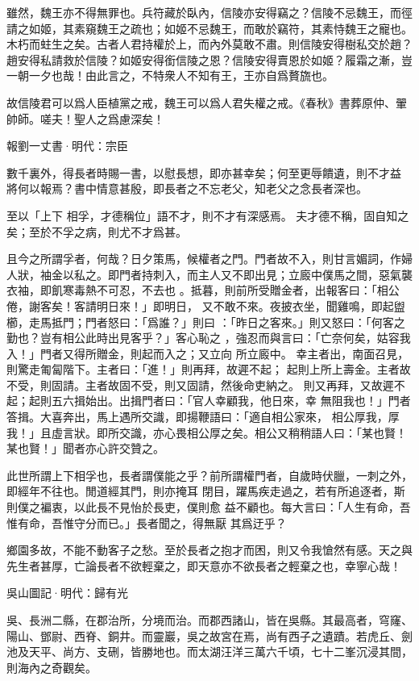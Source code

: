 \documentclass[12pt,a4paper]{ctexbook}
\begin{document}
雖然，魏王亦不得無罪也。兵符藏於臥內，信陵亦安得竊之？信陵不忌魏王，而徑請之如姬，其素窺魏王之疏也；如姬不忌魏王，而敢於竊符，其素恃魏王之寵也。木朽而蛀生之矣。古者人君持權於上，而內外莫敢不肅。則信陵安得樹私交於趙？趙安得私請救於信陵？如姬安得銜信陵之恩？信陵安得賣恩於如姬？履霜之漸，豈一朝一夕也哉！由此言之，不特衆人不知有王，王亦自爲贅旒也。\par
故信陵君可以爲人臣植黨之戒，魏王可以爲人君失權之戒。《春秋》書葬原仲、翬帥師。嗟夫！聖人之爲慮深矣！\par
報劉一丈書·明代：宗臣 \par
數千裏外，得長者時賜一書，以慰長想，即亦甚幸矣；何至更辱饋遺，則不才益 將何以報焉？書中情意甚殷，即長者之不忘老父，知老父之念長者深也。\par
至以「上下 相孚，才德稱位」語不才，則不才有深感焉。 夫才德不稱，固自知之矣；至於不孚之病，則尤不才爲甚。\par
且今之所謂孚者，何哉？日夕策馬，候權者之門。門者故不入，則甘言媚詞，作婦人狀，袖金以私之。即門者持刺入，而主人又不即出見；立廄中僕馬之間，惡氣襲衣袖，即飢寒毒熱不可忍，不去也 。抵暮，則前所受贈金者，出報客曰：「相公倦，謝客矣！客請明日來！」即明日， 又不敢不來。夜披衣坐，聞雞鳴，即起盥櫛，走馬抵門；門者怒曰：「爲誰？」則曰 ：「昨日之客來。」則又怒曰：「何客之勤也？豈有相公此時出見客乎？」客心恥之 ，強忍而與言曰：「亡奈何矣，姑容我入！」門者又得所贈金，則起而入之；又立向 所立廄中。 幸主者出，南面召見，則驚走匍匐階下。主者曰：「進！」則再拜，故遲不起； 起則上所上壽金。主者故不受，則固請。主者故固不受，則又固請，然後命吏納之。 則又再拜，又故遲不起；起則五六揖始出。出揖門者曰：「官人幸顧我，他日來，幸 無阻我也！」門者答揖。大喜奔出，馬上遇所交識，即揚鞭語曰：「適自相公家來， 相公厚我，厚我！」且虛言狀。即所交識，亦心畏相公厚之矣。相公又稍稍語人曰：「某也賢！某也賢！」聞者亦心許交贊之。\par
此世所謂上下相孚也，長者謂僕能之乎？前所謂權門者，自歲時伏臘，一刺之外，即經年不往也。閒道經其門，則亦掩耳 閉目，躍馬疾走過之，若有所追逐者，斯則僕之褊衷，以此長不見怡於長吏，僕則愈 益不顧也。每大言曰：「人生有命，吾惟有命，吾惟守分而已。」長者聞之，得無厭 其爲迂乎？\par
鄉園多故，不能不動客子之愁。至於長者之抱才而困，則又令我愴然有感。天之與先生者甚厚，亡論長者不欲輕棄之，即天意亦不欲長者之輕棄之也，幸寧心哉！\par
吳山圖記·明代：歸有光 \par
吳、長洲二縣，在郡治所，分境而治。而郡西諸山，皆在吳縣。其最高者，穹窿、陽山、鄧尉、西脊、銅井。而靈巖，吳之故宮在焉，尚有西子之遺蹟。若虎丘、劍池及天平、尚方、支硎，皆勝地也。而太湖汪洋三萬六千頃，七十二峯沉浸其間，則海內之奇觀矣。\par
\end{document}
